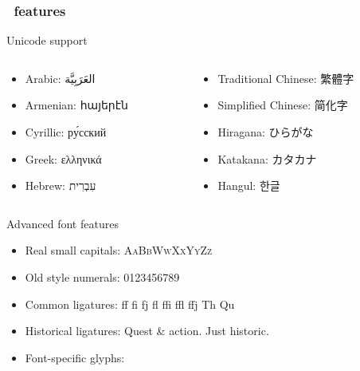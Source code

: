 \documentclass{beamer}                %
\begin{document}
\begin{frame}%
\frametitle{\XeLaTeX \ features}
  \begin{exampleblock}{Unicode support}
  \begin{columns}[T]
  \begin{column}{.45\textwidth}
  \renewcommand{\baselinestretch}{0.9}
  \begin{itemize}
  \item Arabic: \textarabic{العَرَبِيَّة}
  \item Armenian: { հայերէն }
  \item Cyrillic: ру́сский
  \item Greek: ελληνικά
  \item Hebrew: עִבְרִית
  \end{itemize}
  \end{column}
  \begin{column}{.55\textwidth}
  \renewcommand{\baselinestretch}{0.9}
  \begin{itemize}
  \item Traditional Chinese: 繁體字
  \item Simplified Chinese: 简化字 
  \item Hiragana: {\CJKnospace ひらがな}
  \item Katakana: カタカナ
  \item Hangul: { \CJKspace 한글}
  \end{itemize}
  \end{column}
  \end{columns}
\end{exampleblock}
\begin{exampleblock}{Advanced font features}
\renewcommand{\baselinestretch}{0.9}
\begin{itemize}
  \item Real small capitals: \textsc{AaBbWwXxYyZz}
  \item Old style numerals:  0123456789
  \item Common ligatures: ff fi fj fl ffi ffl ffj Th Qu
  \item Historical ligatures:  Quest \& action. Just historic.
  \item Font-specific glyphs:       
\end{itemize}
\end{exampleblock}
\end{frame}
\end{document}
